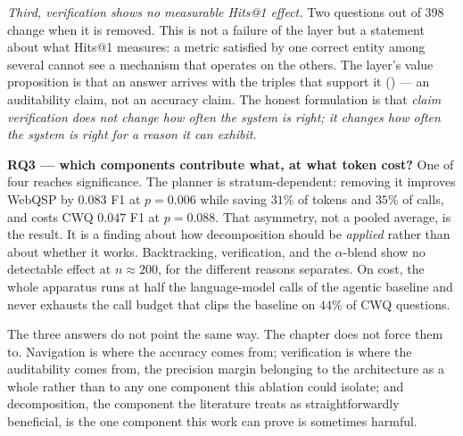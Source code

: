 \emph{Third, verification shows no measurable Hits@1 effect.} Two questions out
of $398$ change when it is removed. This is not a failure of the layer but a
statement about what Hits@1 measures: a metric satisfied by one correct entity
among several cannot see a mechanism that operates on the others. The layer's
value proposition is that an answer arrives with the triples that support it
() --- an auditability claim, not an accuracy claim.
The honest formulation is that \emph{claim verification does not change
how often the system is right; it changes how often the system is right for a
reason it can exhibit}.

\textbf{RQ3 --- which components contribute what, at what token cost?} One of
four reaches significance. The planner is stratum-dependent: removing it
improves WebQSP by $0.083$ F1 at $p = 0.006$ while saving $31\%$ of tokens and
$35\%$ of calls, and costs CWQ $0.047$ F1 at $p = 0.088$. That asymmetry, not a
pooled average, is the result. It is a finding about how decomposition
should be \emph{applied} rather than about whether it works. Backtracking,
verification, and the $\alpha$-blend show no detectable effect at $n \approx
200$, for the different reasons  separates. On cost, the
whole apparatus runs at half the language-model calls of the agentic baseline
and never exhausts the call budget that clips the baseline on $44\%$ of CWQ
questions.

The three answers do not point the same way. The chapter does not force them
to. Navigation is where the accuracy comes from; verification is where the
auditability comes from, the precision margin belonging to the architecture as a
whole rather than to any one component this ablation could isolate; and
decomposition, the component the literature treats as straightforwardly
beneficial, is the one component this work can prove is sometimes harmful.

\endinput
